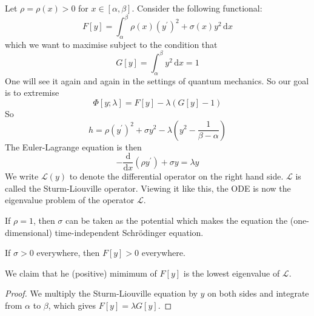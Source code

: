 \begin{example}\label{sturm-liouville}
    Let $\rho=\rho(x)>0$ for $x\in [\alpha,\beta]$.
    Consider the following functional:
    $$F[y]=\int_\alpha^\beta\rho(x)(y^\prime)^2+\sigma(x)y^2\,\mathrm dx$$
    which we want to maximise subject to the condition that
    $$G[y]=\int_\alpha^\beta y^2\,\mathrm dx=1$$
    One will see it again and again in the settings of quantum mechanics.
    So our goal is to extremise
    $$\Phi[y;\lambda]=F[y]-\lambda(G[y]-1)$$
    So
    $$h=\rho(y^\prime)^2+\sigma y^2-\lambda\left( y^2-\frac{1}{\beta-\alpha} \right)$$
    The Euler-Lagrange equation is then
    $$-\frac{\mathrm d}{\mathrm dx}(\rho y^\prime)+\sigma y=\lambda y$$
    We write $\mathcal L(y)$ to denote the differential operator on the right hand side.
    $\mathcal L$ is called the Sturm-Liouville operator.
    Viewing it like this, the ODE is now the eigenvalue problem of the operator $\mathcal L$.
\end{example}
\begin{remark}
    If $\rho=1$, then $\sigma$ can be taken as the potential which makes the equation the (one-dimensional) time-independent Schr\"odinger equation.
\end{remark}
If $\sigma>0$ everywhere, then $F[y]>0$ everywhere.
\begin{claim}
    We claim that he (positive) mimimum of $F[y]$ is the lowest eigenvalue of $\mathcal L$.
\end{claim}
\begin{proof}
    We multiply the Sturm-Liouville equation by $y$ on both sides and integrate from $\alpha$ to $\beta$, which gives $F[y]=\lambda G[y]$.
\end{proof}
